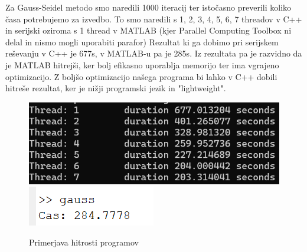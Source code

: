 \documentclass[12pt]{article}
\begin{document}
Za Gauss-Seidel metodo smo naredili 1000 iteracij ter istočasno preverili koliko časa potrebujemo za izvedbo. To smo naredili s 1, 2, 3, 4, 5, 6, 7 threadov v C++ in serijski oziroma s 1 thread v MATLAB (kjer Parallel Computing Toolbox ni delal in nismo mogli uporabiti parafor)
\newline
Rezultat ki ga dobimo pri serijskem reševanju v C++ je 677s, v MATLAB-u pa je 285s. Iz rezultata pa je razvidno da je MATLAB hitrejši, ker bolj efikasno uporablja memorijo ter ima vgrajeno optimizacijo. Z boljšo optimizacijo našega programa bi lahko v C++ dobili hitreše rezultat, ker je nižji programski jezik in "lightweight".
            \begin{figure}[ht]
                \centering
                \includegraphics[width=0.4\linewidth]{paralel.png}
                \includegraphics[width=0.4\linewidth]{casMATLAB.png}
                \renewcommand*\figurename{Slika}
                \caption{Primerjava hitrosti programov}
                \label{Slika:14}
            \end{figure}
\FloatBarrier
\end{document}
